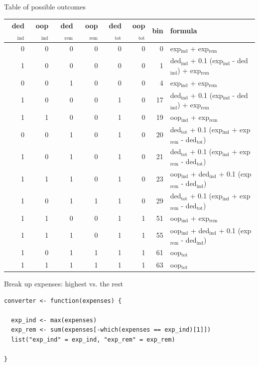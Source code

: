 \documentclass[sans,aspectratio=169,presentation,bigger,fleqn]{beamer}
\begin{document}
\begin{frame}[label=sec-21]{Table of possible outcomes}
\begin{center}
\tiny
\begin{center}
\begin{tabular}{rrrrrrrl}
\toprule
ded\(_{\text{ind}}\) & oop\(_{\text{ind}}\) & ded\(_{\text{rem}}\) & oop\(_{\text{rem}}\) & ded\(_{\text{tot}}\) & oop\(_{\text{tot}}\) & bin & formula\\
\midrule
0 & 0 & 0 & 0 & 0 & 0 & 0 & exp\(_{\text{ind}}\) + exp\(_{\text{rem}}\)\\
1 & 0 & 0 & 0 & 0 & 0 & 1 & ded\(_{\text{ind}}\) + 0.1 (exp\(_{\text{ind}}\) - ded\(_{\text{ind}}\)) + exp\(_{\text{rem}}\)\\
0 & 0 & 1 & 0 & 0 & 0 & 4 & exp\(_{\text{ind}}\) + exp\(_{\text{rem}}\)\\
1 & 0 & 0 & 0 & 1 & 0 & 17 & ded\(_{\text{ind}}\) + 0.1 (exp\(_{\text{ind}}\) - ded\(_{\text{ind}}\)) + exp\(_{\text{rem}}\)\\
1 & 1 & 0 & 0 & 1 & 0 & 19 & oop\(_{\text{ind}}\) + exp\(_{\text{rem}}\)\\
0 & 0 & 1 & 0 & 1 & 0 & 20 & ded\(_{\text{tot}}\) + 0.1 (exp\(_{\text{ind}}\) + exp\(_{\text{rem}}\) - ded\(_{\text{tot}}\))\\
1 & 0 & 1 & 0 & 1 & 0 & 21 & ded\(_{\text{tot}}\) + 0.1 (exp\(_{\text{ind}}\) + exp\(_{\text{rem}}\) - ded\(_{\text{tot}}\))\\
1 & 1 & 1 & 0 & 1 & 0 & 23 & oop\(_{\text{ind}}\) + ded\(_{\text{ind}}\) + 0.1 (exp\(_{\text{rem}}\) - ded\(_{\text{ind}}\))\\
1 & 0 & 1 & 1 & 1 & 0 & 29 & ded\(_{\text{tot}}\) + 0.1 (exp\(_{\text{ind}}\) + exp\(_{\text{rem}}\) - ded\(_{\text{tot}}\))\\
1 & 1 & 0 & 0 & 1 & 1 & 51 & oop\(_{\text{ind}}\) + exp\(_{\text{rem}}\)\\
1 & 1 & 1 & 0 & 1 & 1 & 55 & oop\(_{\text{ind}}\) + ded\(_{\text{ind}}\) + 0.1 (exp\(_{\text{rem}}\) - ded\(_{\text{ind}}\))\\
1 & 0 & 1 & 1 & 1 & 1 & 61 & oop\(_{\text{tot}}\)\\
1 & 1 & 1 & 1 & 1 & 1 & 63 & oop\(_{\text{tot}}\)\\
\bottomrule
\end{tabular}
\end{center}
\normalsize
\end{center}
\end{frame}
\begin{frame}[fragile,label=sec-22]{Break up expenses: highest vs. the rest}
 \scriptsize
\begin{verbatim}
converter <- function(expenses) {
  
  exp_ind <- max(expenses)
  exp_rem <- sum(expenses[-which(expenses == exp_ind)[1]])
  list("exp_ind" = exp_ind, "exp_rem" = exp_rem)
  
}
\end{verbatim}
\normalsize
\end{frame}
\end{document}
